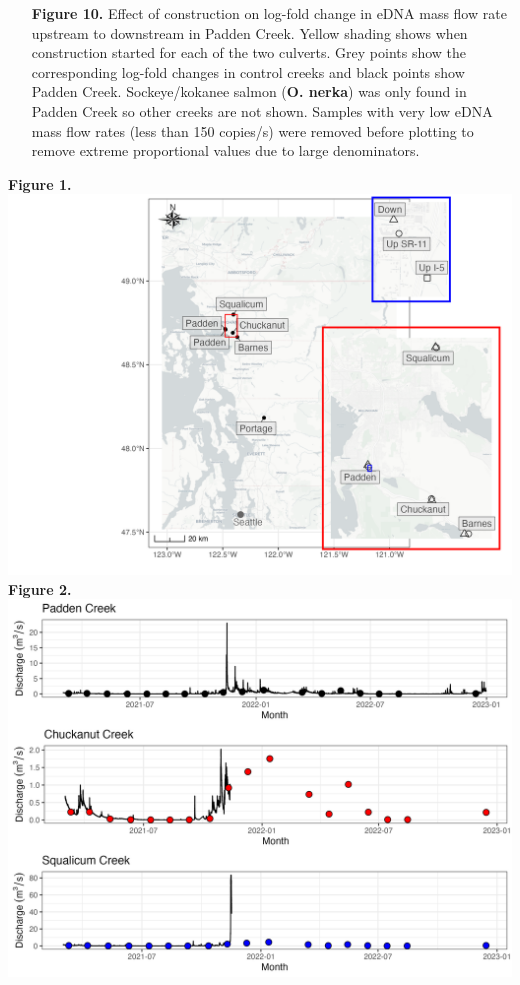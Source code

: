 \documentclass[
]{article}
\begin{document}
\begin{itemize}
\item[\textbf{Figure 10.}] Effect of construction on log-fold change in eDNA mass flow rate upstream to downstream in Padden Creek. Yellow shading shows when construction started for each of the two culverts. Grey points show the corresponding log-fold changes in control creeks and black points show Padden Creek. Sockeye/kokanee salmon (\textbf{O. nerka}) was only found in Padden Creek so other creeks are not shown. Samples with very low eDNA mass flow rates (less than 150 copies/s) were removed before plotting to remove extreme proportional values due to large denominators.

\end{itemize}

\newpage

\textbf{Figure 1.} \includegraphics{../Output/Figures/SiteMap.png}
\newpage \textbf{Figure 2.}
\includegraphics{../Output/Figures/flow_gauges.png} \newpage
\end{document}
